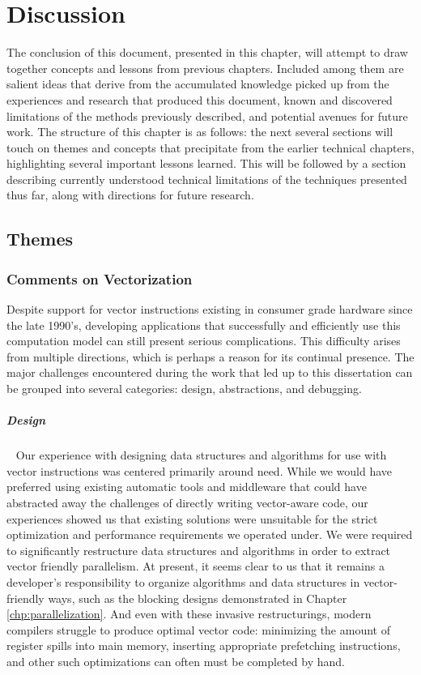 
\chapter{Discussion}
\label{chp:discussion}

The conclusion of this document, presented in this chapter, will
attempt to draw together concepts and lessons from previous chapters.
Included among them are salient ideas that derive from the accumulated
knowledge picked up from the experiences and research that produced
this document, known and discovered limitations of the methods
previously described, and potential avenues for future work. The
structure of this chapter is as follows: the next several sections
will touch on themes and concepts that precipitate from the earlier
technical chapters, highlighting several important lessons
learned. This will be followed by a section describing currently
understood technical limitations of the techniques presented thus far,
along with directions for future research.

\section{Themes}

\subsection{Comments on Vectorization}

Despite support for vector instructions existing in consumer grade
hardware since the late 1990's, developing applications that
successfully and efficiently use this computation model can still
present serious complications. This difficulty arises from multiple
directions, which is perhaps a reason for its continual presence. The
major challenges encountered during the work that led up to this
dissertation can be grouped into several categories: design,
abstractions, and debugging.

\paragraph{Design}~ Our experience with designing data structures and
algorithms for use with vector instructions was centered primarily
around need. While we would have preferred using existing automatic
tools and middleware that could have abstracted away the challenges of
directly writing vector-aware code, our experiences showed us that
existing solutions were unsuitable for the strict optimization and
performance requirements we operated under. We were required to
significantly restructure data structures and algorithms in order to
extract vector friendly parallelism. At present, it seems clear to us
that it remains a developer's responsibility to organize algorithms
and data structures in vector-friendly ways, such as the blocking
designs demonstrated in Chapter \ref{chp:parallelization}. And even
with these invasive restructurings, modern compilers struggle to
produce optimal vector code: minimizing the amount of register spills
into main memory, inserting appropriate prefetching instructions, and
other such optimizations can often must be completed by hand.

